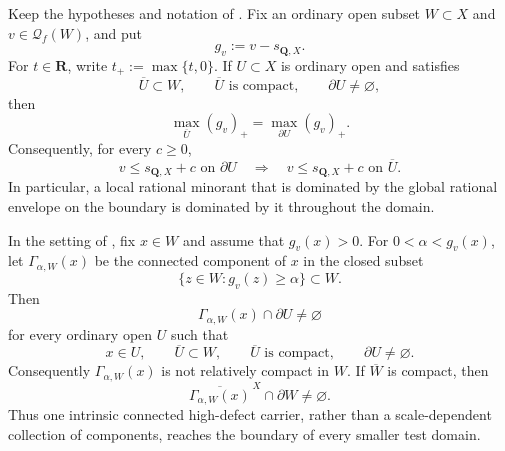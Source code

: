 
\begin{theorem}
\label{thm:p031-rational-defect-maximum-principle}
Keep the hypotheses and notation of
.  Fix an ordinary open subset
$W\subset X$ and $v\in\mathcal Q_f(W)$, and put
\[
                       g_v:=v-s_{\mathbf Q,X}.
\]
For $t\in\mathbf R$, write $t_+:=\max\{t,0\}$.  If $U\subset X$ is
ordinary open and satisfies
\begin{equation}
\label{eq:p031-rational-defect-maximum-principle-domain}
 \overline U\subset W,\qquad \overline U\text{ is compact},\qquad
 \partial U\ne\varnothing,
\end{equation}
then
\begin{equation}
\label{eq:p031-rational-defect-maximum-principle}
        \max_{\overline U}(g_v)_+
                  =\max_{\partial U}(g_v)_+.
\end{equation}
Consequently, for every $c\geq0$,
\begin{equation}
\label{eq:p031-rational-defect-boundary-comparison}
 v\leq s_{\mathbf Q,X}+c\text{ on }\partial U
 \quad\Longrightarrow\quad
 v\leq s_{\mathbf Q,X}+c\text{ on }\overline U.
\end{equation}
In particular, a local rational minorant that is dominated by the global
rational envelope on the boundary is dominated by it throughout the
domain.
\end{theorem}

\begin{corollary}
\label{cor:p031-rational-defect-coherent-carrier}
In the setting of , fix
$x\in W$ and assume that $g_v(x)>0$.  For $0<\alpha<g_v(x)$, let
$\Gamma_{\alpha,W}(x)$ be the connected component of $x$ in the closed
subset
\begin{equation}
\label{eq:p031-rational-defect-intrinsic-superlevel}
             \{z\in W:g_v(z)\geq\alpha\}\subset W.
\end{equation}
Then
\begin{equation}
\label{eq:p031-rational-defect-coherent-boundary-crossing}
       \Gamma_{\alpha,W}(x)\cap\partial U\ne\varnothing
\end{equation}
for every ordinary open $U$ such that
\[
 x\in U,\qquad \overline U\subset W,\qquad
 \overline U\text{ is compact},\qquad \partial U\ne\varnothing.
\]
Consequently $\Gamma_{\alpha,W}(x)$ is not relatively compact in $W$.
If $\overline W$ is compact, then
\begin{equation}
\label{eq:p031-rational-defect-coherent-boundary-limit}
       \overline{\Gamma_{\alpha,W}(x)}^{\,X}\cap\partial W
                         \ne\varnothing.
\end{equation}
Thus one intrinsic connected high-defect carrier, rather than a
scale-dependent collection of components, reaches the boundary of every
smaller test domain.
\end{corollary}

